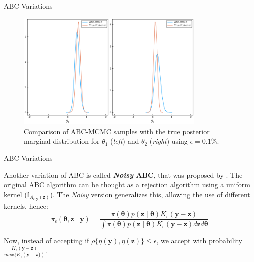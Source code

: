 \documentclass[10pt]{beamer}
\begin{document}
\begin{frame}[fragile]{ABC Variations}

    \begin{figure}[H]
        \centering
        \includegraphics[width=9cm]{images/ABC-MCMC.png}
        \caption{Comparison of ABC-MCMC samples with the true posterior
        marginal distribution for $\theta_1$ (\textit{left}) and
        $\theta_2$ (\textit{right}) using $\epsilon = 0.1\%$.
        }
    \end{figure}

\end{frame}

\begin{frame}[fragile]{ABC Variations}

  Another variation of ABC is called \textbf{\textit{Noisy} ABC}, that was
  proposed by \citet{Wilkinson2013}. The original ABC algorithm can
  be thought as a rejection algorithm using a uniform kernel
  ($\mathbb I_{A_{\epsilon, \bm y}(\bm z)}$). The \textit{Noisy} version
  generalizes this, allowing the use of different kernels, hence:
  $$
  \pi_\epsilon(\bm \theta, \bm z \mid \bm y) = 
  \frac{\pi(\bm \theta) p(\bm z \mid \bm \theta)
  K_\epsilon(\bm y - \bm z)}
  {\int \pi(\bm \theta)
  p(\bm z \mid \bm \theta)K_\epsilon(\bm y - \bm z)d\bm z d \bm \theta}
  $$

  Now, instead of accepting if
  $\rho\{\eta(\bm y),\eta(\bm z)\} \leq \epsilon$, we accept with 
  probability
  $\frac{K_\epsilon(\bm y - \bm z)}{max\{K_\epsilon(\bm y - \bm z\})}
  $.

\end{frame}
\end{document}
